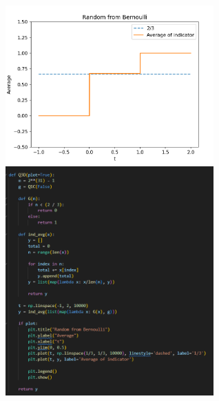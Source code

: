 \documentclass[11pt,letterpaper, leqno]{article}
\begin{document}
\begin{enumerate}
\begin{enumerate}
    \begin{center}
        \includegraphics[width=0.6\textwidth]{Images/3D Plot.png} \quad \includegraphics[width=0.6\textwidth]{Images/3D.png}
    \end{center}
\end{enumerate}



\end{enumerate}
\end{document}
